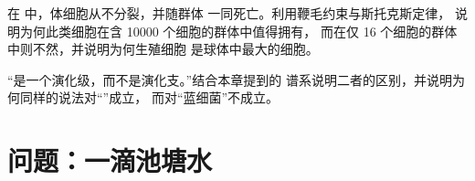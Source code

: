\begin{exercise}[$\star\star\star$]\label{exo:b2:unicellular-diversity:11}
在  中，体细胞从不分裂，并随群体
一同死亡。利用鞭毛约束与斯托克斯定律，
说明为何此类细胞在含 \num{10000} 个细胞的群体中值得拥有，
而在仅 16 个细胞的群体中则不然，并说明为何生殖细胞
是球体中最大的细胞。
\end{exercise}

\begin{exercise}[$\star\star\star$]\label{exo:b2:unicellular-diversity:12}
“是一个演化级，而不是演化支。”结合本章提到的
谱系说明二者的区别，并说明为何同样的说法对“”成立，
而对“蓝细菌”不成立。
\end{exercise}

\section{问题：一滴池塘水}

